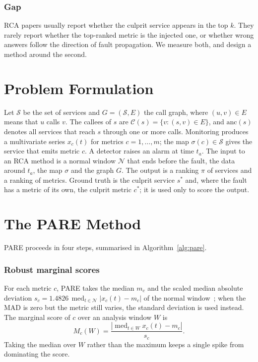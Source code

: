 \documentclass[conference]{IEEEtran}
\DeclareMathOperator*{\med}{med}
\newcommand{\Ccal}{\mathcal{C}}
\newcommand{\Scal}{\mathcal{S}}
\newcommand{\Ncal}{\mathcal{N}}
\begin{document}
\subsubsection{Gap}
RCA papers usually report whether the culprit service appears in the top $k$. They
rarely report whether the top-ranked metric is the injected one, or whether wrong
answers follow the direction of fault propagation. We measure both, and design a
method around the second.

\section{Problem Formulation}\label{sec:problem}
Let $\Scal$ be the set of services and $G=(\Scal,E)$ the call graph, where
$(u,v)\in E$ means that $u$ calls $v$. The callees of $s$ are
$\Ccal(s)=\{v:(s,v)\in E\}$, and $\mathrm{anc}(s)$ denotes all services that reach
$s$ through one or more calls. Monitoring produces a multivariate series
$x_c(t)$ for metrics $c=1,\dots,m$; the map $\sigma(c)\in\Scal$ gives the service
that emits metric $c$. A detector raises an alarm at time $t_a$. The input to an
RCA method is a normal window $\Ncal$ that ends before the fault, the data around
$t_a$, the map $\sigma$ and the graph $G$. The output is a ranking $\pi$ of services
and a ranking of metrics. Ground truth is the culprit service $s^\ast$ and, where
the fault has a metric of its own, the culprit metric $c^\ast$; it is used only to
score the output.

\section{The PARE Method}\label{sec:method}
PARE proceeds in four steps, summarised in Algorithm~\ref{alg:pare}.

\subsubsection{Robust marginal scores}
For each metric $c$, PARE takes the median $m_c$ and the scaled median absolute
deviation $s_c=1.4826\,\med_{t\in\Ncal}|x_c(t)-m_c|$ of the normal
window~\cite{rousseeuw1993mad}; when the MAD is zero but the metric still varies,
the standard deviation is used instead. The marginal score of $c$ over an analysis
window $W$ is
\begin{equation}
M_c(W)=\frac{\left|\med_{t\in W}x_c(t)-m_c\right|}{s_c}.
\label{eq:marginal}
\end{equation}
Taking the median over $W$ rather than the maximum keeps a single spike from
dominating the score.
\end{document}
